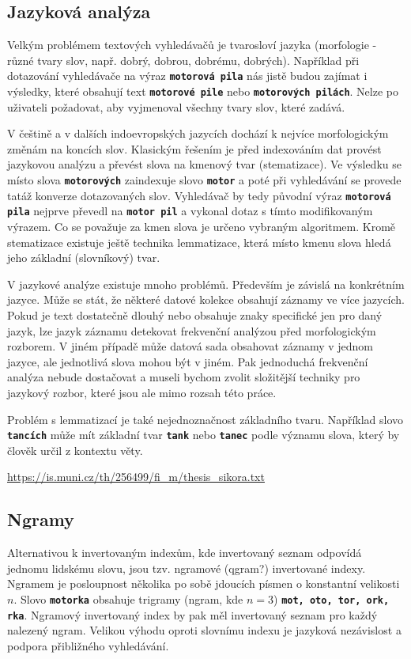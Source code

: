 \documentclass[11pt,letterpaper,oneside,openright]{book}
\newcommand{\bftt}[1]{\texttt{\textbf{#1}}}
\begin{document}
\subsection{Jazyková analýza}
Velkým problémem textových vyhledávačů je tvarosloví jazyka (morfologie - různé
tvary slov, např. dobrý, dobrou, dobrému, dobrých).  Například při dotazování vyhledávače
na výraz \bftt{motorová pila} nás jistě budou zajímat i výsledky, které
obsahují text \bftt{motorové pile} nebo \bftt{motorových pilách}. Nelze po
uživateli požadovat, aby vyjmenoval všechny tvary slov, které zadává.

V češtině a v dalších indoevropských jazycích dochází k nejvíce morfologickým
změnám na koncích slov.  Klasickým řešením je před indexováním dat provést
jazykovou analýzu a převést slova na kmenový tvar (stematizace). Ve výsledku se
místo slova \bftt{motorových} zaindexuje slovo \bftt{motor} a poté při
vyhledávání se provede tatáž konverze dotazovaných slov. Vyhledávač by tedy
původní výraz \bftt{motorová pila} nejprve převedl na \bftt{motor pil} a
vykonal dotaz s tímto modifikovaným výrazem. Co se považuje za kmen slova je
určeno vybraným algoritmem. Kromě stematizace existuje ještě technika
lemmatizace, která místo kmenu slova hledá jeho základní (slovníkový) tvar.

V jazykové analýze existuje mnoho problémů. Především je závislá na konkrétním
jazyce. Může se stát, že některé datové kolekce obsahují záznamy ve více
jazycích. Pokud je text dostatečně dlouhý nebo obsahuje znaky specifické jen
pro daný jazyk, lze jazyk záznamu detekovat frekvenční analýzou před
morfologickým rozborem. V jiném případě může datová sada obsahovat záznamy v
jednom jazyce, ale jednotlivá slova mohou být v jiném. Pak jednoduchá
frekvenční analýza nebude dostačovat a museli bychom zvolit složitější techniky
pro jazykový rozbor, které jsou ale mimo rozsah této práce.

Problém s lemmatizací je také nejednoznačnost základního tvaru. Například slovo
\bftt{tancích} může mít základní tvar \bftt{tank} nebo \bftt{tanec} podle
významu slova, který by člověk určil z kontextu věty.

\url{https://is.muni.cz/th/256499/fi_m/thesis_sikora.txt}

\subsection{Ngramy}
Alternativou k invertovaným indexům, kde invertovaný seznam odpovídá jednomu
lidskému slovu, jsou tzv. ngramové (qgram?) invertované indexy. Ngramem je
posloupnost několika po sobě jdoucích písmen o konstantní velikosti $n$.  Slovo
\bftt{motorka} obsahuje trigramy (ngram, kde $n = 3$) \bftt{mot, oto, tor,
ork, rka}.  Ngramový invertovaný index by pak měl invertovaný seznam pro každý
nalezený ngram. Velikou výhodu oproti slovnímu indexu je jazyková nezávislost a
podpora přibližného vyhledávání.
\end{document}
